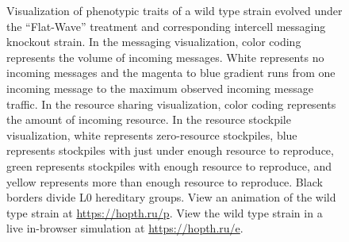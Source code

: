 \begin{figure}[!htbp]
\begin{center}
\caption{
Visualization of phenotypic traits of a wild type strain evolved under the ``Flat-Wave'' treatment and corresponding intercell messaging knockout strain.
In the messaging visualization, color coding represents the volume of incoming messages.
White represents no incoming messages and the magenta to blue gradient runs from one incoming message to the maximum observed incoming message traffic.
In the resource sharing visualization, color coding represents the amount of incoming resource.
In the resource stockpile visualization, white represents zero-resource stockpiles, blue represents stockpiles with just under enough resource to reproduce, green represents stockpiles with enough resource to reproduce, and yellow represents more than enough resource to reproduce.
Black borders divide L0 hereditary groups.
View an animation of the wild type strain at \url{https://hopth.ru/p}.
View the wild type strain in a live in-browser simulation at \url{https://hopth.ru/e}.
}
\label{fig:ko-intermessaging-sharing}
\end{center}
\end{figure}
